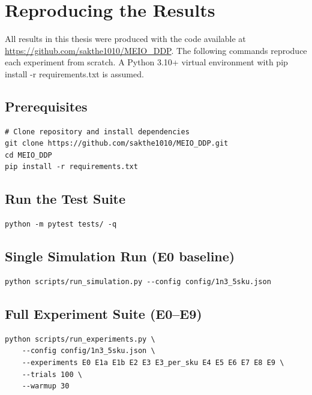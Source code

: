 \chapter{Reproducing the Results}
\label{appn:reproduction}

All results in this thesis were produced with the code available at
\url{https://github.com/sakthe1010/MEIO\_DDP}.  The following commands
reproduce each experiment from scratch.
A Python 3.10+ virtual environment with pip install -r requirements.txt
is assumed.

\section*{Prerequisites}

\begin{verbatim}
# Clone repository and install dependencies
git clone https://github.com/sakthe1010/MEIO_DDP.git
cd MEIO_DDP
pip install -r requirements.txt
\end{verbatim}

\section*{Run the Test Suite}

\begin{verbatim}
python -m pytest tests/ -q
\end{verbatim}

\section*{Single Simulation Run (E0 baseline)}

\begin{verbatim}
python scripts/run_simulation.py --config config/1n3_5sku.json
\end{verbatim}

\section*{Full Experiment Suite (E0--E9)}

\begin{verbatim}
python scripts/run_experiments.py \
    --config config/1n3_5sku.json \
    --experiments E0 E1a E1b E2 E3 E3_per_sku E4 E5 E6 E7 E8 E9 \
    --trials 100 \
    --warmup 30
\end{verbatim}

